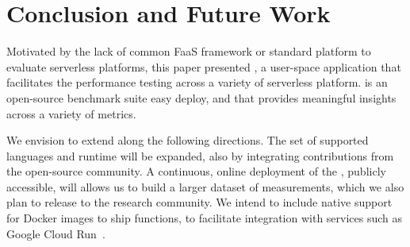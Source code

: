 
\section{Conclusion and Future Work}\label{sec:conclusion}

Motivated by the lack of common FaaS framework or standard platform to evaluate serverless platforms, this paper presented \sys, a user-space application that facilitates the performance testing across a variety of serverless platform.
\sys is an open-source benchmark suite easy deploy, and that provides meaningful insights across a variety of metrics. 

We envision to extend \sys along the following directions.
The set of supported languages and runtime will be expanded, also by integrating contributions from the open-source community.
A continuous, online deployment of the \sys, publicly accessible, will allows us to build a larger dataset of measurements, which we also plan to release to the research community.
We intend to include native support for Docker images to ship functions, to facilitate integration with services such as Google Cloud Run~\cite{cloudrun}.


